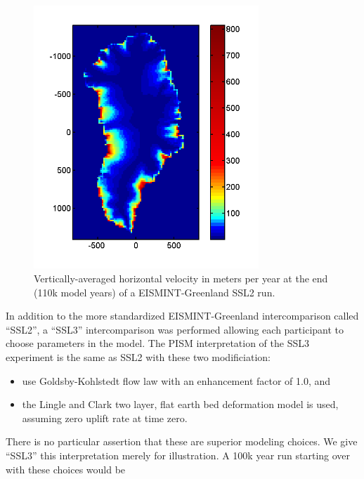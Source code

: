 \documentclass[11pt,final]{amsart}
\begin{document}
\begin{figure}[ht]
\includegraphics[height=3.9in,keepaspectratio=true]{figs/greencbar_SSL2}
\caption{Vertically-averaged horizontal velocity in meters per year at the end (110k model years) of a EISMINT-Greenland SSL2 run.}
\label{fig:ssl2cbar}
\end{figure}

In addition to the more standardized EISMINT-Greenland intercomparison called ``SSL2'', a ``SSL3'' intercomparison was performed allowing each participant to choose parameters in the model.  The PISM interpretation of the SSL3 experiment is the same as SSL2 with these two modificiation: \begin{itemize}
\item use Goldsby-Kohlstedt flow law \cite{GoldsbyKohlstedt} with an enhancement factor of 1.0, and
\item the Lingle and Clark \cite{BLKfastearth,LingleClark} two layer, flat earth bed deformation model is used, assuming zero uplift rate at time zero.
\end{itemize}
There is no particular assertion that these are superior modeling choices.  We give ``SSL3'' this interpretation merely for illustration.
A 100k year run starting over with these choices would be
\end{document}
